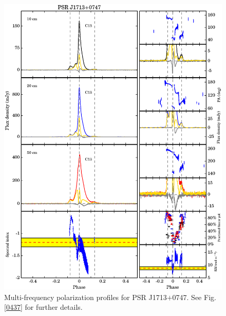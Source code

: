 \documentclass[useAMS,usenatbib]{mn2e}
\begin{document}
\begin{appendices}
\begin{figure}
\begin{center}
\includegraphics[width=6 in]{1713.ps}
\caption{Multi-frequency polarization profiles for PSR J1713$+$0747. 
See Fig. \ref{0437} for further details.}
\label{1713}
\end{center}
\end{figure}


\end{appendices}
\end{document}
